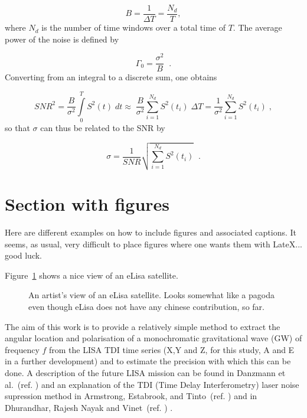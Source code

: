 \documentclass[11pt,twoside]{article}
\begin{document}
\begin{enumerate}
\begin{equation}\label{eq2}
B = \frac{1}{{\Delta T}} = \frac{{N_d }}{T} ,
\end{equation}
where $N_d$ is the number of time windows over a total time of $T$. The average power of the noise is defined by 

\begin{equation}\label{eq3}
\Gamma _0  = \frac{{\sigma ^2 }}{B} \;\;.
\end{equation}
Converting from an integral to a discrete sum, one obtains

\begin{equation}\label{eq4}
SNR^2  = \frac{B}{{\sigma ^2 }}\int\limits_0^T {S^2 (t)\;dt}  \approx \;\frac{B}{{\sigma ^2 }}\sum\limits_{i = 1}^{N_d } {S^2 (t_i )\;\Delta T}  = \frac{1}{{\sigma ^2 }}\sum\limits_{i = 1}^{N_d } {S^2 (t_i )\;} ,
\end{equation}
so that $\sigma$ can thus be related to the SNR by 

\begin{equation}\label{eq5}
\sigma  = \frac{1}{{SNR}}\sqrt {\sum\limits_{i = 1}^{N_d } {S^2 (t_i )} }  \;\;.
\end{equation}


\section{Section with figures} 
Here are different examples on how to include figures and associated captions. It seems, as usual, very difficult to place figures where one wants them with LateX... good luck.

Figure~\ref{fig2} shows a nice view of an eLisa satellite. 

\begin{figure}[!h]
\caption{\label{fig2}An artist's view of an eLisa satellite. Looks somewhat like a pagoda even though eLisa does not have any chinese contribution, so far.}
\end{figure}

The aim of this work is to provide a relatively simple method to extract the angular location and polarisation of a monochromatic gravitational wave (GW) of frequency $f$ from the LISA TDI  time series (X,Y and Z, for this study, A and E in a further development) and to estimate the precision with which this can be done. A description of the future LISA mission can be found in Danzmann et al.~(ref. \cite{Danzmann:2009uz}) and  an explanation of the TDI (Time Delay Interferometry) laser noise supression method  in Armstrong, Estabrook, and Tinto~(ref. \cite{Tinto:2002vr}) and in Dhurandhar, Rajesh Nayak and Vinet~(ref. \cite{Petiteau:2008vs}) .


\end{enumerate}
\end{document}
